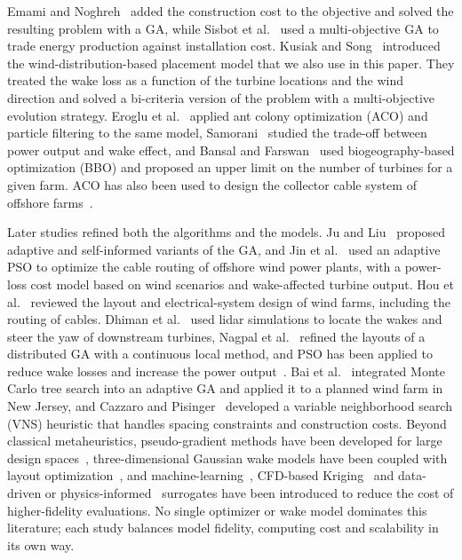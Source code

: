 \documentclass[journal,twoside]{IEEEtran}
\begin{document}
Emami and Noghreh~\cite{Emami2010} added the construction cost to the objective and solved the resulting problem with a GA, while Sisbot et al.~\cite{Sisbot2010} used a multi-objective GA to trade energy production against installation cost. Kusiak and Song~\cite{Kusiak2010} introduced the wind-distribution-based placement model that we also use in this paper. They treated the wake loss as a function of the turbine locations and the wind direction and solved a bi-criteria version of the problem with a multi-objective evolution strategy. Eroglu et al.~\cite{Eroglu2012,Eroglu2013} applied ant colony optimization (ACO) and particle filtering to the same model, Samorani~\cite{Samorani2013} studied the trade-off between power output and wake effect, and Bansal and Farswan~\cite{Bansal2017} used biogeography-based optimization (BBO) and proposed an upper limit on the number of turbines for a given farm. ACO has also been used to design the collector cable system of offshore farms~\cite{Srikakulapu2018}.

Later studies refined both the algorithms and the models. Ju and Liu~\cite{Ju2019} proposed adaptive and self-informed variants of the GA, and Jin et al.~\cite{Jin2019} used an adaptive PSO to optimize the cable routing of offshore wind power plants, with a power-loss cost model based on wind scenarios and wake-affected turbine output. Hou et al.~\cite{Hou2019} reviewed the layout and electrical-system design of wind farms, including the routing of cables. Dhiman et al.~\cite{Dhiman2020} used lidar simulations to locate the wakes and steer the yaw of downstream turbines, Nagpal et al.~\cite{Nagpal2021} refined the layouts of a distributed GA with a continuous local method, and PSO has been applied to reduce wake losses and increase the power output~\cite{Asaah2021}. Bai et al.~\cite{Bai2022} integrated Monte Carlo tree search into an adaptive GA and applied it to a planned wind farm in New Jersey, and Cazzaro and Pisinger~\cite{Cazzaro2022} developed a variable neighborhood search (VNS) heuristic that handles spacing constraints and construction costs. Beyond classical metaheuristics, pseudo-gradient methods have been developed for large design spaces~\cite{Quaeghebeur2021}, three-dimensional Gaussian wake models have been coupled with layout optimization~\cite{Tao2020}, and machine-learning~\cite{Yang2023}, CFD-based Kriging~\cite{Wang2024} and data-driven or physics-informed~\cite{Yang2024,Li2025} surrogates have been introduced to reduce the cost of higher-fidelity evaluations. No single optimizer or wake model dominates this literature; each study balances model fidelity, computing cost and scalability in its own way.
\end{document}
